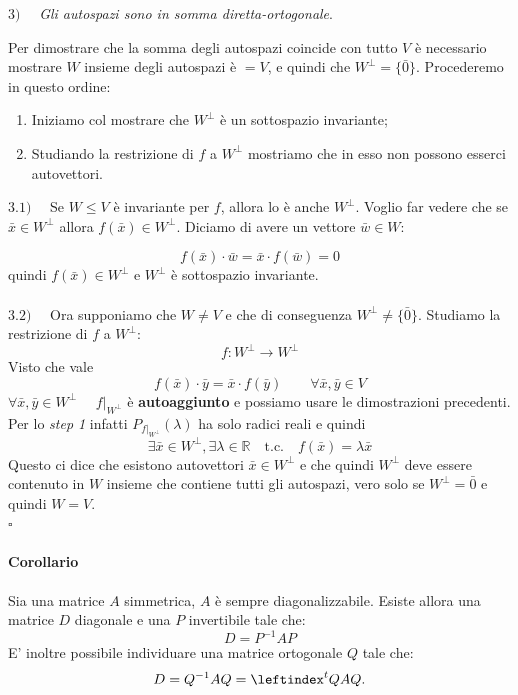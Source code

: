 \documentclass[x11names]{article}
\newcommand*{\QEDB}{\null\nobreak\hfill\ensuremath{\square}}%
\begin{document}
\begin{es}{}
$3) \quad$ \textit{Gli autospazi sono in somma diretta-ortogonale}.

Per dimostrare che la somma degli autospazi coincide con tutto $V$ è necessario mostrare $W$ insieme degli autospazi è $ = V$, e quindi che $W^\perp = \{\bar{0}\}$. Procederemo in questo ordine:
\begin{enumerate}
	\item Iniziamo col mostrare che $W^\perp$ è un sottospazio invariante;
	\item Studiando la restrizione di $f$ a $W^\perp$ mostriamo che in esso non possono esserci autovettori.
\end{enumerate}

$3.1) \quad$ Se $W \leq V$ è invariante per $f$, allora lo è anche $W^\perp$. Voglio far vedere che se $\bar{x} \in W^\perp$ allora $f(\bar{x})  \in W^\perp$. Diciamo di avere un vettore $\bar{w} \in W$:

\[
f(\bar{x}) \cdot \bar{w} = \bar{x} \cdot f(\bar{w})  = 0
\]
quindi $f(\bar{x}) \in W^\perp$ e $W^\perp$ è sottospazio invariante. \\ \\

$3.2) \quad$ Ora supponiamo che $W \neq V$ e che di conseguenza $W^\perp \neq \{\bar{0}\}$. Studiamo la restrizione di $f$ a $W^\perp$:
\[
f: W^\perp \to W^\perp 
\]
Visto che vale
\[
f(\bar{x}) \cdot \bar{y} =  \bar{x}  \cdot f(\bar{y})  \qquad \forall \bar{x},\bar{y} \in V
\]
$\forall\bar{x},\bar{y} \in W^\perp \quad$ $f|_{W^\perp}$ è \textbf{autoaggiunto} e possiamo usare le dimostrazioni precedenti. Per lo \textit{step 1} infatti $P_{f|_{W^\perp}}(\lambda)$ ha solo radici reali e quindi
\[
\exists \bar{x} \in W^\perp, \exists \lambda \in \mathbb{R} \quad \text{t.c.} \quad f(\bar{x}) = \lambda \bar{x}
\]
Questo ci dice che esistono autovettori $\bar{x} \in W^\perp$ e che quindi $W^\perp$ deve essere contenuto in $W$ insieme che contiene tutti gli autospazi, vero solo se $W^\perp = {\bar{0}}$ e quindi $W = V$.
\\
\QEDB
\end{es}



\paragraph{Corollario}
Sia una matrice $A$ simmetrica, $A$ è sempre diagonalizzabile. Esiste allora una matrice  $D$ diagonale e una $P$ invertibile tale che:
 \[
D = P^{-1}AP
\] 
E' inoltre possibile individuare una matrice ortogonale $Q$ tale che:
\[
D = Q^{-1}AQ = \leftindex^t{Q}AQ
.\] 
\end{document}
